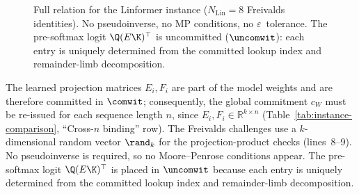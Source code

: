 \begin{figure}[!t]
\centering
\scriptsize
{}
\caption{Full relation for the Linformer instance ($N_{\text{Lin}}{=}8$ Freivalds identities). No pseudoinverse, no MP conditions, no $\varepsilon$~tolerance. The pre-softmax logit $\Q(E\K)^{\top}$ is uncommitted ($\uncomwit$): each entry is uniquely determined from the committed lookup index and remainder-limb decomposition.}
\label{fig:relation-linformer}
\end{figure}

The learned projection matrices $E_i, F_i$ are part of the model weights and are therefore committed in $\comwit$; consequently, the global commitment $c_W$ must be re-issued for each sequence length $n$, since $E_i, F_i \in \mathbb{R}^{k \times n}$ (Table~\ref{tab:instance-comparison}, ``Cross-$n$ binding'' row). The Freivalds challenges use a $k$-dimensional random vector $\rand_k$ for the projection-product checks (lines~8--9). No pseudoinverse is required, so no Moore--Penrose conditions appear. The pre-softmax logit $\Q(E\K)^{\top}$ is placed in $\uncomwit$ because each entry is uniquely determined from the committed lookup index and remainder-limb decomposition.

